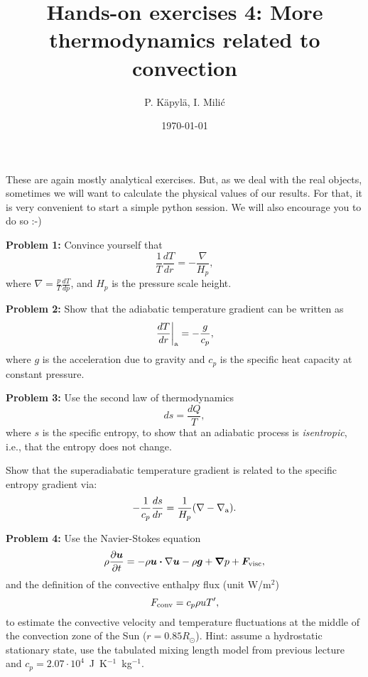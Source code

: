 \documentclass[12pt]{article}
\title{Hands-on exercises 4: More thermodynamics related to convection}
\author{P. K\"{a}pyl\"{a}, I. Mili\'{c}}
\date{\today}
\begin{document}
\maketitle

These are again mostly analytical exercises. But, as we deal with the
real objects, sometimes we will want to calculate the physical values
of our results. For that, it is very convenient to start a simple
python session. We will also encourage you to do so :-)

{\bf Problem 1:} Convince yourself that
\begin{equation}
\frac{1}{T}\frac{dT}{dr} = - \frac{\nabla}{H_p},
\end{equation}
where $\nabla = \frac{p}{T}\frac{dT}{dp}$, and $H_p$ is the pressure
scale height.

{\bf Problem 2:} Show that the adiabatic temperature gradient can be
written as
\begin{equation}
\left.\frac{dT}{dr}\right|_{\rm a} = -\frac{g}{c_p},
\end{equation}
where $g$ is the acceleration due to gravity and $c_p$ is the specific
heat capacity at constant pressure.

{\bf Problem 3:} Use the second law of thermodynamics
\begin{equation}
ds = \frac{dQ}{T},
\end{equation}
where $s$ is the specific entropy, to show that an adiabatic process
is \emph{isentropic}, i.e., that the entropy does not change.

Show that the superadiabatic temperature gradient is related to the
specific entropy gradient via:
\begin{equation}
-\frac{1}{c_p} \frac{ds}{dr} = \frac{1}{H_p} (\nabla - \nabla_{\rm a}).
\end{equation}

{\bf Problem 4:} Use the Navier-Stokes equation
\begin{equation}
\rho\frac{\partial {\bm u}}{\partial t} = - \rho{\bm u}\bm\cdot\nabla{\bm u} - \rho {\bm g} + \bm\nabla p + {\bm F}_{\rm visc},
\end{equation}
and the definition of the convective enthalpy flux (unit W/m$^2$)
\begin{equation}
F_{\rm conv} = c_p \rho u T',
\end{equation}
to estimate the convective velocity and temperature fluctuations at
the middle of the convection zone of the Sun ($r=0.85R_\odot$). Hint:
assume a hydrostatic stationary state, use the tabulated mixing length
model from previous lecture and $c_p =
2.07\cdot10^4$~J~K$^{-1}$~kg$^{-1}$.
\end{document}
